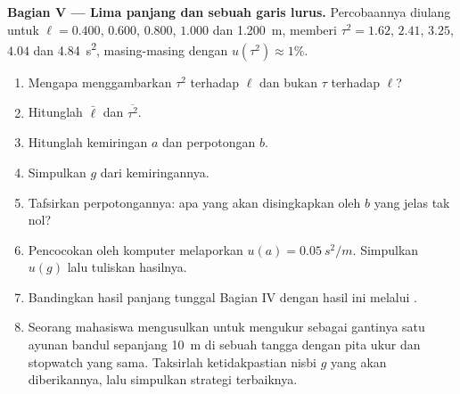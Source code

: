 \begin{problem}
\medskip
\noindent\textbf{Bagian V --- Lima panjang dan sebuah garis lurus.}
Percobaannya diulang untuk $\ell = 0.400$, $0.600$, $0.800$,
$1.000$ dan \qty{1.200}{m}, memberi $\tau^2 = 1.62$, $2.41$, $3.25$,
$4.04$ dan \qty{4.84}{s^2}, masing-masing dengan $u(\tau^2) \approx 1\%$.
\begin{enumerate}[resume]
  \item Mengapa menggambarkan $\tau^2$ terhadap $\ell$ dan bukan $\tau$
        terhadap $\ell$?
  \item Hitunglah $\bar\ell$ dan $\overline{\tau^2}$.
  \item Hitunglah kemiringan  $a$ dan perpotongan $b$.
  \item Simpulkan $g$ dari kemiringannya.
  \item Tafsirkan perpotongannya: apa yang akan disingkapkan oleh $b$
        yang jelas tak nol?
  \item Pencocokan oleh komputer melaporkan $u(a) = \qty{0.05}{s^2/m}$.
        Simpulkan $u(g)$ lalu tuliskan hasilnya.
  \item Bandingkan hasil panjang tunggal Bagian IV dengan hasil ini
        melalui .
  \item Seorang mahasiswa mengusulkan untuk mengukur sebagai gantinya
        satu ayunan bandul sepanjang \qty{10}{m} di sebuah tangga
        dengan pita ukur dan stopwatch yang sama. Taksirlah
        ketidakpastian nisbi $g$ yang akan diberikannya, lalu
        simpulkan strategi terbaiknya.
\end{enumerate}
\end{problem}
